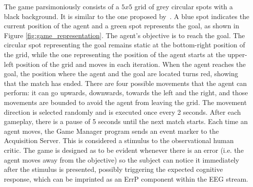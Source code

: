 \documentclass[journal]{IEEEtran}
\begin{document}
\label{cognitive_experiment_system}{
The game parsimoniously consists of a $5x5$ grid of grey circular spots with a black background.  It is similar to the one proposed by~\cite{Iturrate2013}.  A blue spot indicates the current position of the agent and a green spot represents the goal, as shown in Figure  \ref{fig:game_representation}. The agent's objective is to reach the goal. The circular spot representing the goal remains static at the bottom-right position of the grid, while the one representing the position of the agent starts at the upper-left position of the grid and moves in each iteration.  When the agent reaches the goal, the position where the agent and the goal are located turns red, showing that the match has ended. There are four possible movements that the agent can perform: it can go upwards, downwards, towards the left and the right, and those movements are bounded to avoid the agent from leaving the grid. The movement direction is selected randomly and is executed once every 2 seconds.  After each gameplay, there is a pause of 5 seconds until the next match starts. Each time an agent moves, the Game Manager program sends an event marker to the Acquisition Server.  This is considered a stimulus to the observational human critic.  The game is designed as to be evident whenever there is an error (i.e. the agent moves away from the objective) so the subject can notice it immediately after the stimulus is presented, possibly triggering the expected cognitive response, which can be imprinted as an ErrP component within the EEG stream.

}
\end{document}
